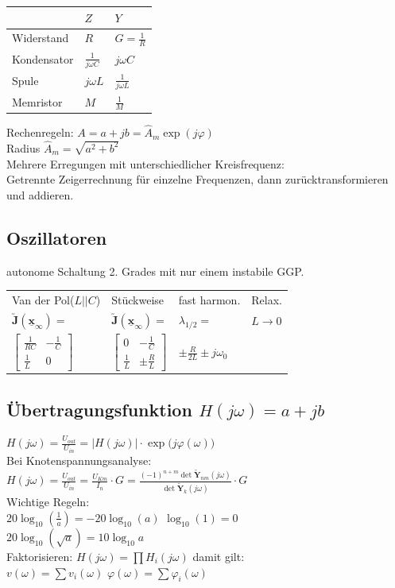 \documentclass[6pt,a4paper]{scrartcl}
\newcommand{\mat}[1]{\ensuremath{\begin{bmatrix} #1 \end{bmatrix}}}				%
\newcommand{\ma}[1]{\ensuremath{\utilde{\boldsymbol {#1}}}}
\renewcommand{\vec}[1]{\ensuremath{\underline{\boldsymbol {#1}}}}
\newcommand{\ra}[0]{\ensuremath{\rightarrow}} 									%
\begin{document}
\begin{multicols}{4}
\everymath{\displaystyle}
\begin{tabular}{l|ll}
	& $Z$ & $Y$\\ \midrule
Widerstand & $R$ & $G = \frac{1}{R}$ \\
Kondensator & $\frac{1}{j \omega C}$ & $j \omega C$\\
Spule & $j \omega L$ & $\frac{1}{j \omega L}$ \\
Memristor & $M$ & $\frac{1}{M}$\\
\end{tabular}
\everymath{\textstyle}



Rechenregeln:
$A = a + j b = \hat A_m \exp(j \varphi)$\\
Radius $\hat A_m = \sqrt{a^2 + b^2}$\\

Mehrere Erregungen mit unterschiedlicher Kreisfrequenz:\\
Getrennte Zeigerrechnung für einzelne Frequenzen, dann zurücktransformieren und addieren.

\subsection{Oszillatoren}
autonome Schaltung 2. Grades mit nur einem instabile GGP.\\
\begin{tabular}{l|lll}
Van der Pol($L||C$) & Stückweise & fast harmon. & Relax.\\
$\ma J(\vec x_\infty)=$ & $\ma J(\vec x_\infty)=$ & $\lambda_{1/2} =$ & $L\ra 0$\\
$\mat{\frac{1}{RC} & -\frac{1}{C} \\ \frac{1}{L} & 0}$ & $\mat{0 & -\frac{1}{C} \\ \frac{1}{L} & \pm \frac{R}{L} }$ & $\pm \frac{R}{2L} \pm j \omega_0$\\
\end{tabular}




\subsection{Übertragungsfunktion $H(j\omega) = a + j b$}
$H(j \omega) = \frac{U_{out}}{U_{in}} = |H(j \omega)| \cdot \exp\bigl(j\varphi(\omega)\bigr)$\\

Bei Knotenspannungsanalyse:\\
$H(j\omega) = \frac{U_{out}}{U_{in}} = \frac{U_{Km}}{I_n}\cdot G = \frac{(-1)^{n+m} \det \ma Y_{nm}(j\omega)}{\det \ma Y_k(j\omega)}\cdot G$\\[0.5em]
Wichtige Regeln:\\
$20\log_{10} \left( \frac{1}{a} \right) = -20\log_{10} \left( a \right)$ \qquad $\log_{10}(1) = 0$\\ $20\log_{10} \left( \sqrt{a} \right) = 10\log_{10} a$ \\[0.5em]
Faktorisieren: $H(j \omega) = \prod H_i(j \omega)$ damit gilt:\\
$v(\omega) = \sum v_i(\omega)$ \qquad $\varphi(\omega) = \sum \varphi_i(\omega)$\\


\end{multicols}
\end{document}
